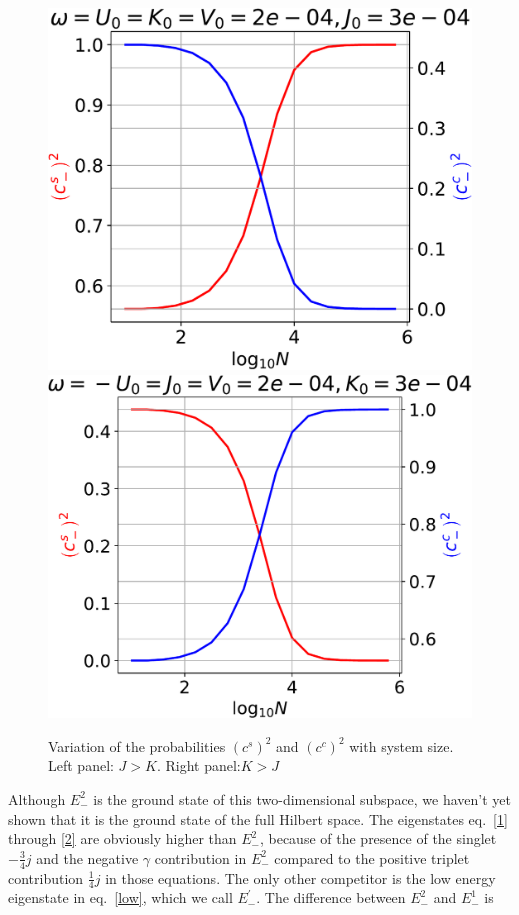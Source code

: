 \documentclass[12pt,twoside]{article}
\numberwithin{equation}{section}
\begin{document}
\begin{figure}[http]
	\centering
	\includegraphics[scale=0.5]{../figures/gamma_q1.pdf}\\
	\includegraphics[scale=0.5]{../figures/gamma_q3.pdf}
	\caption{Variation of the probabilities \(\left(c^s\right)^2\) and \(\left(c^c\right)^2\) with system size. Left panel: \(J>K\). Right panel:\(K>J\)}
	\label{fig:}
\end{figure}
Although \(E^2_-\) is the ground state of this two-dimensional subspace, we haven't yet shown that it is the ground state of the full Hilbert space. The eigenstates eq.~\ref{1} through \ref{2} are obviously higher than \(E_-^2\), because of the presence of the singlet \(- \frac{3}{4}j\) and the negative \(\gamma\) contribution in \(E_-^2\) compared to the positive triplet contribution \( \frac{1}{4}j\) in those equations. The only other competitor is the low energy eigenstate in eq.~\ref{low}, which we call \(E_-^\prime\). The difference between \(E_-^2\) and \(E_-^1\) is
\end{document}
